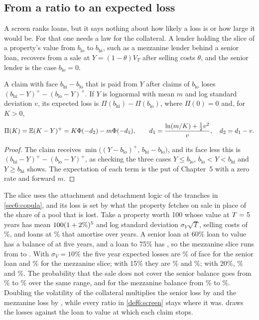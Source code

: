 \begin{chapterrefs}
\subsection{From a ratio to an expected loss}

A screen ranks loans, but it says nothing about how likely a loss is or how large it would be.
For that one needs a law for the collateral. A lender holding the slice of a property's value from
$b_{\mathrm{lo}}$ to $b_{\mathrm{hi}}$, such as a mezzanine lender behind a senior loan, recovers from a sale at
$Y=(1-\theta)V_T$ after selling costs $\theta$, and the senior lender is the case $b_{\mathrm{lo}}=0$.

\begin{proposition}\label{prop6:slice}
A claim with face $b_{\mathrm{hi}}-b_{\mathrm{lo}}$ that is paid from $Y$ after claims of $b_{\mathrm{lo}}$ loses
$(b_{\mathrm{hi}}-Y)^+-(b_{\mathrm{lo}}-Y)^+$. If $Y$ is lognormal with mean $m$ and log standard deviation
$v$, its expected loss is $\Pi(b_{\mathrm{hi}})-\Pi(b_{\mathrm{lo}})$, where $\Pi(0)=0$ and, for $K>0$,
\[
  \Pi(K)=\mathbb{E}(K-Y)^+=K\Phi(-d_2)-m\Phi(-d_1),\qquad d_1=\frac{\ln(m/K)+\tfrac12v^2}{v},\quad d_2=d_1-v .
\]
\end{proposition}

\begin{proof}
The claim receives $\min\bigl((Y-b_{\mathrm{lo}})^+,\,b_{\mathrm{hi}}-b_{\mathrm{lo}}\bigr)$, and its face less this
is $(b_{\mathrm{hi}}-Y)^+-(b_{\mathrm{lo}}-Y)^+$, as checking the three cases $Y\le b_{\mathrm{lo}}$,
$b_{\mathrm{lo}}<Y<b_{\mathrm{hi}}$ and $Y\ge b_{\mathrm{hi}}$ shows. The expectation of each term is the put
of Chapter~5 with a zero rate and forward $m$.
\end{proof}

The slice uses the attachment and detachment logic of the tranches in \cref{sec6:copula}, and its loss
is set by what the property fetches on sale in place of the share of a pool that is lost. Take a property worth 100 whose value at $T=5$ years has mean $100(1+2\%)^{5}$
and log standard deviation $\sigma_V\sqrt T$, selling costs of \slCost\%, and loans at \slRate\% that
amortise over \slAmort{} years. A senior loan at 60\% loan to value has a balance of \slBs{} at five
years, and a loan to 75\% has \slBm, so the mezzanine slice runs from \slBs{} to \slBm. With
$\sigma_V=10\%$ the five year expected losses are \slSenTen\% of face for the senior loan and
\slMezTen\% for the mezzanine slice; with 15\% they are \slSenFifteen\% and \slMezFifteen\%; with
20\%, \slSenTwenty\% and \slMezTwenty\%. The probability that the sale does not cover the senior
balance goes from \slPdSenTen\% to \slPdSenTwenty\% over the same range, and for the mezzanine
balance from \slPdMezTen\% to \slPdMezTwenty\%. Doubling the volatility of the collateral multiplies the senior loss by \slSenRatio{} and the
mezzanine loss by \slMezRatio, while every ratio in
\cref{def6:screen} stays where it was.  draws the losses against the loan to value
at which each claim stops.


\end{chapterrefs}
